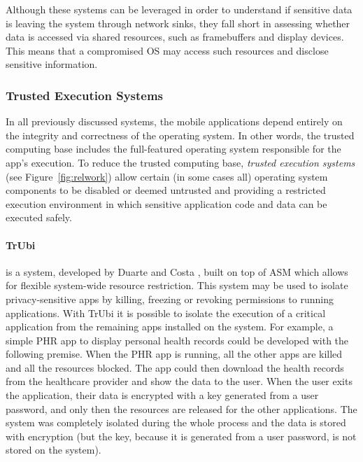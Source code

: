 Although these systems can be leveraged in order to understand if sensitive data is leaving the system through network sinks, they fall short in assessing whether data is accessed via shared resources, such as framebuffers and display devices. This means that a compromised OS may access such resources and disclose sensitive information.

\subsubsection{Trusted Execution Systems}
\label{sec:tee}

In all previously discussed systems, the mobile applications depend entirely on the integrity and correctness of the operating system. In other words, the trusted computing base includes the full-featured operating system responsible for the app's execution. To reduce the trusted computing base, \emph{trusted execution systems} (see Figure~\ref{fig:relwork}) allow certain (in some cases all) operating system components to be disabled or deemed untrusted and providing a restricted execution environment in which sensitive application code and data can be executed safely.

\paragraph{\textbf{TrUbi}} is a system, developed by Duarte \cite{nunoduarte} and Costa \cite{miguelcosta}, built on top of ASM \cite{heuser2014asm} which allows for flexible system-wide resource restriction. This system may be used to isolate privacy-sensitive apps by killing, freezing or revoking permissions to running applications. With TrUbi it is possible to isolate the execution of a critical application from the remaining apps installed on the system. For example, a simple \ac{PHR} app to display personal health records could be developed with the following premise. When the \ac{PHR} app is running, all the other apps are killed and all the resources blocked. The app could then download the health records from the healthcare provider and show the data to the user. When the user exits the application, their data is encrypted with a key generated from a user password, and only then the resources are released for the other applications. The system was completely isolated during the whole process and the data is stored with encryption (but the key, because it is generated from a user password, is not stored on the system).

